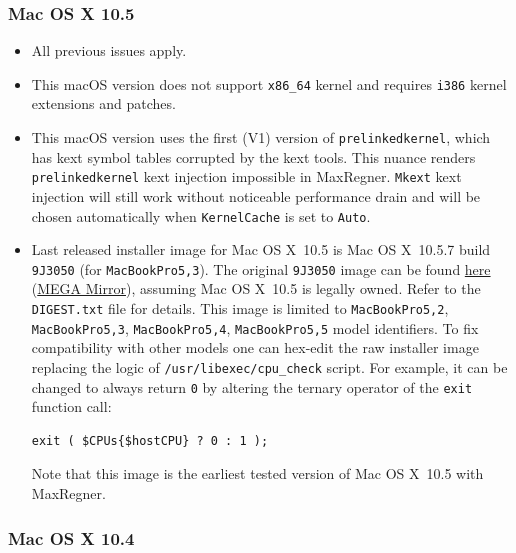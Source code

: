 \documentclass[]{article}
\begin{document}
\subsubsection{Mac OS X 10.5}\label{legacy105}

\begin{itemize}
  \item All previous issues apply.
  \item This macOS version does not support \texttt{x86\_64} kernel
    and requires \texttt{i386} kernel extensions and patches.
  \item This macOS version uses the first (V1) version of \texttt{prelinkedkernel},
    which has kext symbol tables corrupted by the kext tools. This nuance
    renders \texttt{prelinkedkernel} kext injection impossible in MaxRegner.
    \texttt{Mkext} kext injection will still work without noticeable
    performance drain and will be chosen automatically when
    \texttt{KernelCache} is set to \texttt{Auto}.
  \item Last released installer image for Mac OS X~10.5 is Mac OS X~10.5.7
    build \texttt{9J3050} (for \texttt{MacBookPro5,3}). The original \texttt{9J3050} image can be found
    \href{https://archive.org/details/10.5.7-9-j-3050}{here}
    (\href{https://mega.nz/folder/inRBTarD#zanf7fUbviwz3WHBU5xpCg}{MEGA Mirror}),
    assuming Mac OS X~10.5 is legally owned. Refer to the \texttt{DIGEST.txt} file
    for details. This image is limited to \texttt{MacBookPro5,2}, \texttt{MacBookPro5,3},
    \texttt{MacBookPro5,4}, \texttt{MacBookPro5,5} model identifiers.
    To fix compatibility with other models one can hex-edit the raw installer image replacing
    the logic of \texttt{/usr/libexec/cpu\_check} script. For example, it can be changed
    to always return \texttt{0} by altering the ternary operator of the \texttt{exit} function call:
\begin{lstlisting}[label=hex105, style=ocbash]
exit ( $CPUs{$hostCPU} ? 0 : 1 );
\end{lstlisting}
    Note that this image is the earliest tested version of Mac OS X~10.5 with MaxRegner.
\end{itemize}

\subsubsection{Mac OS X 10.4}\label{legacy104}
\end{document}
